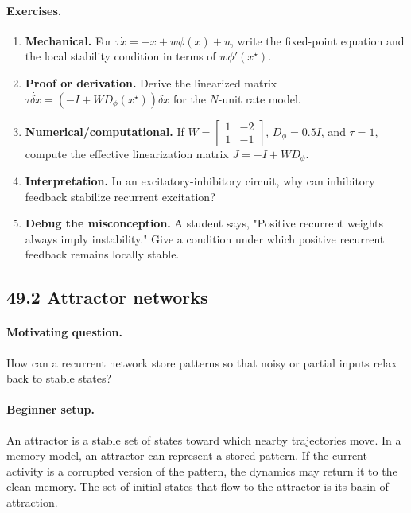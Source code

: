 \paragraph{Exercises.}
\begin{enumerate}[label=\textbf{49.1.\arabic*.}, leftmargin=*]
\item \textbf{Mechanical.} For \(\tau\dot x=-x+w\phi(x)+u\), write the fixed-point equation and the local stability condition in terms of \(w\phi'(x^\star)\).
\item \textbf{Proof or derivation.} Derive the linearized matrix \(\tau\dot{\delta x}=(-I+WD_\phi(x^\star))\delta x\) for the \(N\)-unit rate model.
\item \textbf{Numerical/computational.} If \(W=\begin{bmatrix}1&-2\\1&-1\end{bmatrix}\), \(D_\phi=0.5I\), and \(\tau=1\), compute the effective linearization matrix \(J=-I+WD_\phi\).
\item \textbf{Interpretation.} In an excitatory-inhibitory circuit, why can inhibitory feedback stabilize recurrent excitation?
\item \textbf{Debug the misconception.} A student says, "Positive recurrent weights always imply instability." Give a condition under which positive recurrent feedback remains locally stable.
\end{enumerate}

\subsection{49.2 Attractor networks}

\paragraph{Motivating question.}
How can a recurrent network store patterns so that noisy or partial inputs relax back to stable states?

\paragraph{Beginner setup.}
An attractor is a stable set of states toward which nearby trajectories move. In a memory model, an attractor can represent a stored pattern. If the current activity is a corrupted version of the pattern, the dynamics may return it to the clean memory. The set of initial states that flow to the attractor is its basin of attraction.

